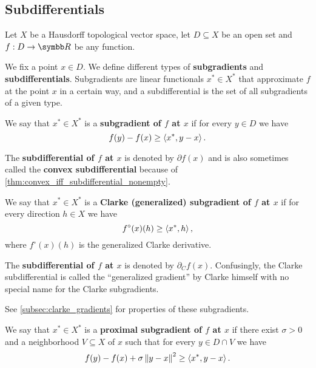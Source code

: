 \subsection{Subdifferentials}\label{subsec:subdifferentials}

Let \( X \) be a Hausdorff topological vector space, let \( D \subseteq X \) be an open set and \( f: D \to \BB{R} \) be any function.

\begin{definition}\label{def:subdifferentials}
  We fix a point \( x \in D \). We define different types of \textbf{subgradients} and \textbf{subdifferentials}. Subgradients are linear functionals \( x^* \in X^* \) that approximate \( f \) at the point \( x \) in a certain way, and a subdifferential is the set of all subgradients of a given type.

  \begin{defenum}
    \cite[59]{Clarke2013} We say that \( x^* \in X^* \) is a \textbf{subgradient of \( f \) at \( x \)} if for every \( y \in D \) we have
    \begin{equation*}
      f(y) - f(x) \geq \left\langle x^*, y - x \right\rangle.
    \end{equation*}

    The \textbf{subdifferential of \( f \) at \( x \)} is denoted by \( \partial f(x) \) and is also sometimes called the \textbf{convex subdifferential} because of \cref{thm:convex_iff_subdifferential_nonempty}.

    \cite[definition 10.3]{Clarke2013} We say that \( x^* \in X^* \) is a \textbf{Clarke (generalized) subgradient of \( f \) at \( x \)} if for every direction \( h \in X \) we have
    \begin{equation*}
      f^\circ(x)(h) \geq \left\langle x^*, h \right\rangle,
    \end{equation*}
    where \( f^\circ(x)(h) \) is the generalized Clarke derivative.

    The \textbf{subdifferential of \( f \) at \( x \)} is denoted by \( \partial_C f(x) \). Confusingly, the Clarke subdifferential is called the \enquote{generalized gradient} by Clarke himself with no special name for the Clarke subgradients.

    See \cref{subsec:clarke_gradients} for properties of these subgradients.

    \cite[227]{Clarke2013} We say that \( x^* \in X^* \) is a \textbf{proximal subgradient of \( f \) at \( x \)} if there exist \( \sigma > 0 \) and a neighborhood \( V \subseteq X \) of \( x \) such that for every \( y \in D \cap V \) we have
    \begin{equation*}
      f(y) - f(x) + \sigma \left\Vert y - x \right\Vert^2 \geq \left\langle x^*, y - x \right\rangle.
    \end{equation*}


\end{defenum}
\end{definition}

